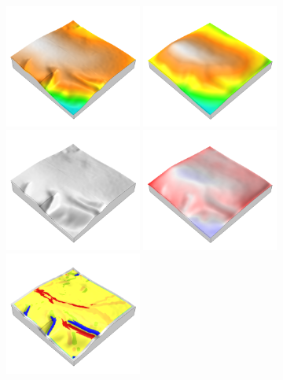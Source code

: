\documentclass[prodmode,acmtochi]{acmsmall} %
\begin{document}
\begin{figure}[h!]
\begin{center}
		\includegraphics[width=0.4\textwidth]{images/render_3d/dem_4.png}
		\includegraphics[width=0.4\textwidth]{images/render_3d/mean_dem_4.png}
		\includegraphics[width=0.4\textwidth]{images/render_3d/dem_difference_4.png}
		\includegraphics[width=0.4\textwidth]{images/render_3d/mean_dem_difference_4.png}
		\includegraphics[width=0.4\textwidth]{images/render_3d/forms_4.png}

\end{center}
\end{figure}
\end{document}
